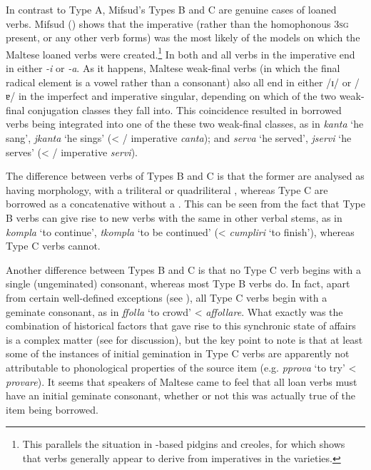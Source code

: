 \documentclass[output=paper]{langsci/langscibook}
\begin{document}
In contrast to Type A, Mifsud's Types B and C are genuine cases of loaned verbs. Mifsud (\citeyear[110--116]{mifsudloanverbs}) shows that the imperative (rather than the homophonous 3\textsc{sg} present, or any other verb forms) was the most likely  of the  models on which the Maltese loaned verbs were created.\footnote{This parallels the situation in -based pidgins and creoles, for which \cite{Versteegh2014pidgin} shows that verbs generally appear to derive from imperatives in the  varieties.} In both  and  all verbs in the imperative end in either \textit{-i} or \textit{-a}. As it happens, Maltese weak-final verbs (in which the final radical element is a vowel rather than a consonant) also all end in either /ɪ/ or /ɐ/ in the imperfect and imperative singular, depending on which of the two weak-final conjugation classes they fall into. This coincidence resulted in borrowed  verbs being integrated into one of the these two weak-final classes, as in \textit{kanta} `he sang', \textit{jkanta} `he sings' (< / imperative \textit{canta}); and \textit{serva} `he served', \textit{jservi} `he serves' (< / imperative \textit{servi}).

The difference between verbs of Types B and C is that the former are analysed as having  morphology, with a triliteral or quadriliteral , whereas Type C are borrowed as a concatenative  without a . This can be seen from the fact that Type B verbs can give rise to new verbs with the same  in other verbal stems, as in \textit{kompla} `to continue', \textit{tkompla} `to be continued' (<  \textit{cumpliri} `to finish'), whereas Type C verbs cannot.\largerpage

Another difference between Types B and C is that no Type C verb begins with a single (ungeminated) consonant, whereas most Type B verbs do. In fact, apart from certain well-defined exceptions (see \citealt[152]{mifsudloanverbs}), all Type C verbs begin with a geminate consonant, as in \textit{ffolla} `to crowd' <  \textit{affollare}. What exactly was the combination of historical factors that gave rise to this synchronic state of affairs is a complex matter (see \citealt[158--168]{mifsudloanverbs} for discussion), but the key point to note is that at least some of the instances of initial gemination in Type C verbs are apparently not attributable to phonological properties of the source item (e.g. \textit{pprova} `to try' <  \textit{provare}). It seems that speakers of Maltese came to feel that all loan verbs must have an initial geminate consonant, whether or not this was actually true of the item being borrowed.
\end{document}
